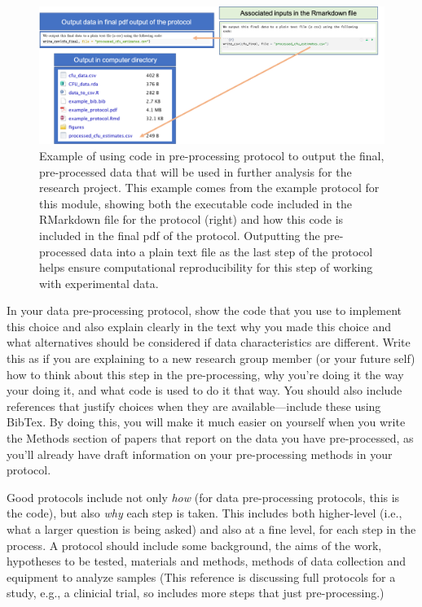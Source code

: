 \documentclass[]{tufte-book}
\begin{document}
\begin{figure}
\includegraphics[width=\textwidth]{figures/protocol_output_data} \caption[Example of using code in pre-processing protocol to output the final, pre-processed data that will be used in further analysis for the research project]{Example of using code in pre-processing protocol to output the final, pre-processed data that will be used in further analysis for the research project. This example comes from the example protocol for this module, showing both the executable code included in the RMarkdown file for the protocol (right) and how this code is included in the final pdf of the protocol. Outputting the pre-processed data into a plain text file as the last step of the protocol helps ensure computational reproducibility for this step of working with experimental data.}\label{fig:protocoloutput}
\end{figure}

In your data pre-processing protocol, show the code that you use to implement
this choice and also explain clearly in the text why you made this choice and
what alternatives should be considered if data characteristics are different.
Write this as if you are explaining to a new research group member (or your
future self) how to think about this step in the pre-processing, why you're
doing it the way your doing it, and what code is used to do it that way. You
should also include references that justify choices when they are
available---include these using BibTex. By doing this, you will make it much
easier on yourself when you write the Methods section of papers that report on
the data you have pre-processed, as you'll already have draft information on
your pre-processing methods in your protocol.

Good protocols include not only \emph{how} (for data pre-processing protocols, this
is the code), but also \emph{why} each step is taken. This includes both higher-level
(i.e., what a larger question is being asked) and also at a fine level, for each
step in the process. A protocol should include some background, the
aims of the work, hypotheses to be tested, materials and methods, methods of
data collection and equipment to analyze samples \citep{al2016protocol} (This
reference is discussing full protocols for a study, e.g., a clinicial trial, so
includes more steps that just pre-processing.)
\end{document}
